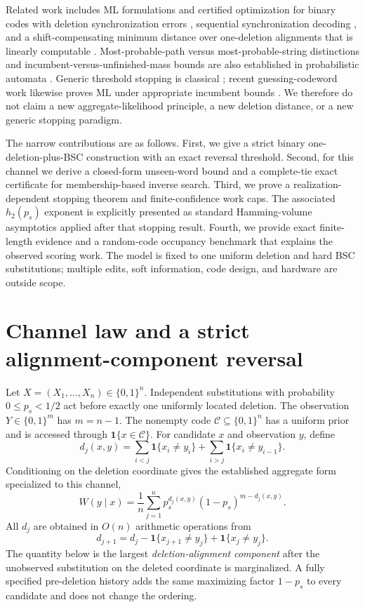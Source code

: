 \documentclass[conference]{IEEEtran}
\newcommand{\C}{\mathcal C}
\newcommand{\one}{\mathbf 1}
\begin{document}
Related work includes ML formulations and certified optimization for binary codes with deletion
synchronization errors \cite{yang2020decoding}, sequential synchronization decoding
\cite{banerjee2022sequential}, and a shift-compensating minimum distance over one-deletion
alignments that is linearly computable \cite{gershon2022genomic}. Most-probable-path versus
most-probable-string distinctions and incumbent-versus-unfinished-mass bounds are also established
in probabilistic automata \cite{higuera2013computing}. Generic threshold stopping is classical
\cite{fagin2003optimal}; recent guessing-codeword work likewise proves ML under appropriate
incumbent bounds \cite{wang2025guessing}. We therefore do not claim a new aggregate-likelihood
principle, a new deletion distance, or a new generic stopping paradigm.

The narrow contributions are as follows. First, we give a strict binary one-deletion-plus-BSC
construction with an exact reversal threshold. Second, for this channel we derive a closed-form
unseen-word bound and a complete-tie exact certificate for membership-based inverse search. Third,
we prove a realization-dependent stopping theorem and finite-confidence work caps. The associated
$h_2(p_s)$ exponent is explicitly presented as standard Hamming-volume asymptotics applied after
that stopping result. Fourth, we provide exact finite-length evidence and a random-code occupancy
benchmark that explains the observed scoring work. The model is fixed to one uniform deletion and
hard BSC substitutions; multiple edits, soft information, code design, and hardware are outside
scope.

\section{Channel law and a strict alignment-component reversal}
Let $X=(X_1,\ldots,X_n)\in\{0,1\}^n$. Independent substitutions with probability
$0\le p_s<1/2$ act before exactly one uniformly located deletion. The observation
$Y\in\{0,1\}^{m}$ has $m=n-1$. The nonempty code $\C\subseteq\{0,1\}^n$ has a uniform prior and is
accessed through $\one\{x\in\C\}$. For candidate $x$ and observation $y$, define
\begin{equation}
 d_j(x,y)=\sum_{i<j}\one\{x_i\ne y_i\}+\sum_{i>j}\one\{x_i\ne y_{i-1}\}.
 \label{eq:dj}
\end{equation}
Conditioning on the deletion coordinate gives the established aggregate form specialized to this
channel,
\begin{equation}
 W(y\mid x)=\frac1n\sum_{j=1}^{n}p_s^{d_j(x,y)}(1-p_s)^{m-d_j(x,y)}. \label{eq:likelihood}
\end{equation}
All $d_j$ are obtained in $O(n)$ arithmetic operations from
\begin{equation}
 d_{j+1}=d_j-\one\{x_{j+1}\ne y_j\}+\one\{x_j\ne y_j\}. \label{eq:slide}
\end{equation}
The quantity below is the largest \emph{deletion-alignment component} after the unobserved
substitution on the deleted coordinate is marginalized. A fully specified pre-deletion history
adds the same maximizing factor $1-p_s$ to every candidate and does not change the ordering.
\end{document}
